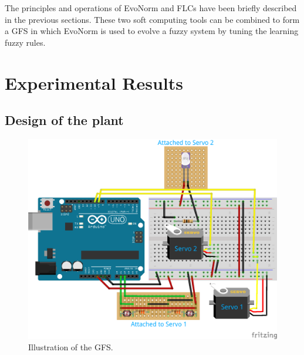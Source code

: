 \documentclass{sig-alternate-05-2015}
\begin{document}
The principles and operations of EvoNorm and FLCs have been briefly described in the previous sections. These two soft computing tools can be combined to form a GFS in which EvoNorm is used to evolve a fuzzy system by tuning the learning fuzzy rules.

\section{Experimental Results}

\subsection{Design of the plant}

\begin{figure}[h]
\centering
\includegraphics [scale=0.4]{gfsillustration}
\caption{Illustration of the GFS.}
\end{figure}
\end{document}
